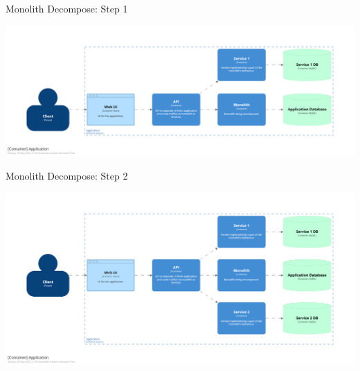 \documentclass{slide}
\begin{document}
\begin{frame}{Monolith Decompose: Step 1}
    \begin{adjustwidth}{-12mm}{-12mm}
        \centering
        \includegraphics[trim=195 195 195 195,clip,width=0.97\paperwidth]{diagrams/decompose2.png}
    \end{adjustwidth}
\end{frame}

\begin{frame}{Monolith Decompose: Step 2}
    \begin{adjustwidth}{-12mm}{-12mm}
        \centering
        \includegraphics[trim=195 195 195 195,clip,width=0.97\paperwidth]{diagrams/decompose3.png}
    \end{adjustwidth}
\end{frame}
\end{document}
